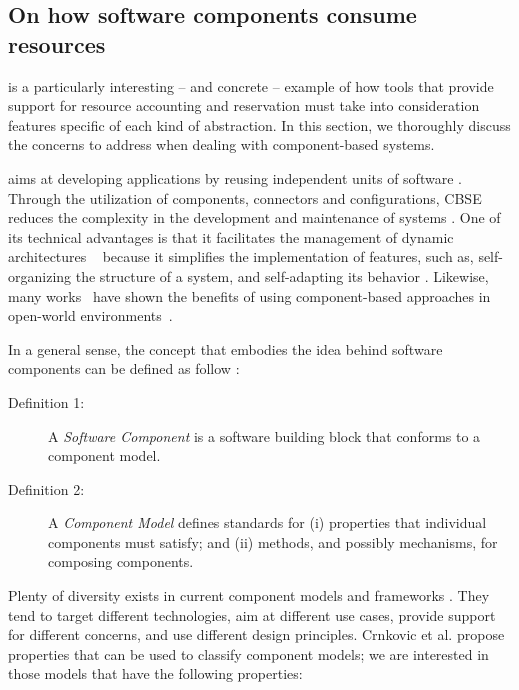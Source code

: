 \subsection{On how software components consume resources} \label{sec:components-oriented-resource-awareness}

 is a particularly interesting -- and concrete -- example of how tools that provide support for resource accounting and reservation must take into consideration features specific of each kind of abstraction.
In this section, we thoroughly discuss the concerns to address when dealing with component-based systems.  

 aims at developing applications by reusing independent units of software \cite{cbse-conference, Crnkovic2011}.
Through the utilization of components, connectors and configurations, CBSE reduces the complexity in the development and maintenance of systems \cite{xadl,Medvidovic:2000,VanOmmering-et-al-00}.
One of its technical advantages is that it facilitates the management of dynamic architectures
~\cite{DBLP:journals/ase/NittoGMPP08, Johnson:2015:CSM:2735960.2735979}
because it simplifies the implementation of features, such as, self-organizing the structure of a system, and self-adapting its behavior
\cite{PanzicaLaManna:2012:LDU:2304736.2304764, Johnson:2015:CSM:2735960.2735979,Zhang:2009:MVD:1509239.1509262}.
Likewise, many works~\cite{cbse-conference} have shown the benefits of using component-based approaches in open-world environments~\cite{baresi2006toward, Caporuscio:2010:AIA:1985522.1985547, Perez-Palacin:2010:PAO:1712605.1712614}.

In a general sense, the concept that embodies the idea behind software components can be defined as follow
\cite{Crnkovic2011}:

\begin{description}
\item[Definition 1:] A \textit{Software Component} is a software building block that conforms to a component model. 
\item[Definition 2:] A \textit{Component Model} defines standards for (i) properties that individual components must satisfy; and (ii) methods, and possibly mechanisms, for composing components.
\end{description}

Plenty of diversity exists in current component models and frameworks \cite{Heineman2001, SZYPERSKI2002, Crnkovic2011}.
They tend to target different technologies, aim at different use cases, provide support for different concerns, and use different design principles.
Crnkovic et al. \cite{Crnkovic2011} propose properties that can be used to classify component models; we are interested in those models that have the following properties:

